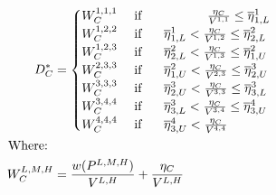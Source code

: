 \documentclass[12pt]{article}
\begin{document}
\begin{appendices}

\begin{align}\label{equation:generaldemand}
\begin{split}
D^{*}_C &=
\begin{cases}
W^{1,1,1}_C   & \text{ if } \hspace{1.7cm}                                               \frac{ \eta_C }{ V^{1,1} }  \leq \overline{\eta}^{1}_{1,L}  \\
W^{1,2,2}_C   & \text{ if } \hspace{.5cm} \overline{\eta}^{1}_{1,L} <    \frac{ \eta_C }{ V^{1,2} }    \leq \overline{\eta}^{2}_{2,L}  \\
W^{1,2,3}_C   & \text{ if } \hspace{.5cm} \overline{\eta}^{2}_{2,L} <    \frac{ \eta_C }{ V^{1,3} }    \leq \overline{\eta}^{2}_{1,U}  \\
W^{2,3,3}_C   & \text{ if } \hspace{.5cm} \overline{\eta}^{2}_{1,U} <    \frac{ \eta_C }{ V^{2,3} }    \leq \overline{\eta}^{3}_{2,U}  \\ 
W^{3,3,3}_C   & \text{ if } \hspace{.5cm} \overline{\eta}^{3}_{2,U} <    \frac{ \eta_C }{ V^{3,3} }    \leq \overline{\eta}^{3}_{3,L}  \\ 
W^{3,4,4}_C   & \text{ if } \hspace{.5cm} \overline{\eta}^{3}_{3,L} <    \frac{ \eta_C }{ V^{3,4} }    \leq \overline{\eta}^{4}_{3,U}  \\ 
W^{4,4,4}_C   & \text{ if } \hspace{.5cm} \overline{\eta}^{4}_{3,U} <    \frac{ \eta_C }{ V^{4,4} }  
\end{cases}\\
\text{Where: } & \\
W^{L,M,H}_C        		&=  \frac{ w(P^{L,M,H}) }{ V^{L,H} }  + \frac{ \eta_C }{ V^{L,H} }   \\

\end{split}
\end{align}
\end{appendices}
\end{document}
